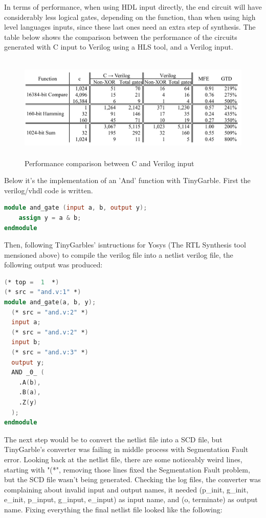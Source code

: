 \begin{refsection}
In terms of performance, when using HDL input directly, the end circuit will have considerably less logical gates, depending on the function, than when using high level languages inputs, since these last ones need an extra step of synthesis. The table below shows the comparison between the performance of the circuits generated with
C input to Verilog using a HLS tool, and a Verilog input.

\begin{figure}[H]
	\centering
	\includegraphics[width=1\textwidth, height=5cm]{./sdf/secure_multiparty_computation/figures/tiny_garble_CvsHDL.png}
    \caption{Performance comparison between C and Verilog input\cite{Songhori}}\label{fig:tinygarble_comparison}
\end{figure}

\newpage

Below it's the implementation of an 'And' function with TinyGarble.
First the verilog/vhdl code is written.

\begin{lstlisting}[caption={and\_gate.v}, language=Verilog] 
module and_gate (input a, b, output y);
	assign y = a & b;
endmodule
\end{lstlisting}

Then, following TinyGarbles' isntructions for Yosys (The RTL Synthesis tool mensioned above) to compile the verilog file into a netlist verilog file, the following output was produced:

\begin{lstlisting}[caption={and\_gate\_netlist.v}, language=Verilog] 
(* top =  1  *)
(* src = "and.v:1" *)
module and_gate(a, b, y);
  (* src = "and.v:2" *)
  input a;
  (* src = "and.v:2" *)
  input b;
  (* src = "and.v:3" *)
  output y;
  AND _0_ (
    .A(b),
    .B(a),
    .Z(y)
  );
endmodule
\end{lstlisting}

The next step would be to convert the netlist file into a SCD file, but TinyGarble's converter was failing in middle process with Segmentation Fault error.
Looking back at the netlist file, there are some noticeably weird lines, starting with "(*", removing those lines fixed the Segmentation Fault problem, but the SCD file wasn't being generated.
Checking the log files, the converter was complaining about invalid input and output names, it needed (p\_init, g\_init, e\_init, p\_input, g\_input, e\_input) as input name, and (o, terminate) as output name.
Fixing everything the final netlist file looked like the following:


\end{refsection}
